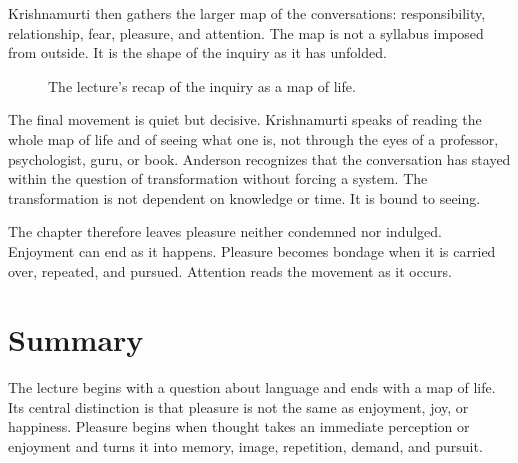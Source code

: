Krishnamurti then gathers the larger map of the conversations: responsibility, relationship, fear, pleasure, and attention. The map is not a syllabus imposed from outside. It is the shape of the inquiry as it has unfolded.
\begin{figure}
\centering
{}

The lecture's recap of the inquiry as a map of life.
\end{figure}

The final movement is quiet but decisive. Krishnamurti speaks of reading the whole map of life and of seeing what one is, not through the eyes of a professor, psychologist, guru, or book. Anderson recognizes that the conversation has stayed within the question of transformation without forcing a system. The transformation is not dependent on knowledge or time. It is bound to seeing.

The chapter therefore leaves pleasure neither condemned nor indulged. Enjoyment can end as it happens. Pleasure becomes bondage when it is carried over, repeated, and pursued. Attention reads the movement as it occurs.

\section{Summary}

The lecture begins with a question about language and ends with a map of life. Its central distinction is that pleasure is not the same as enjoyment, joy, or happiness. Pleasure begins when thought takes an immediate perception or enjoyment and turns it into memory, image, repetition, demand, and pursuit.


